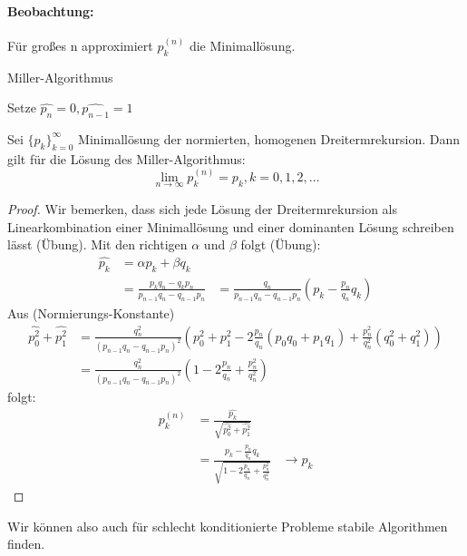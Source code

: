 \paragraph{Beobachtung:} Für großes n approximiert $p_k^{(n)}$ die Minimallösung.\\
\begin{algorithm}[H]
\caption{Miller-Algorithmus}
 Setze $\hat{p_n}=0, \hat{p_{n-1}} =1$\\
\end{algorithm}
\begin{theorem}
Sei $\{p_k\}_{k=0}^{\infty}$ Minimallösung der normierten, homogenen Dreitermrekursion. %
Dann gilt für die Lösung des Miller-Algorithmus:
\[
\lim_{n \to \infty} p_k^{(n)}=p_k , k=0,1,2,\ldots
\]
\end{theorem}
\begin{proof}
Wir bemerken, dass sich jede Lösung der Dreitermrekursion als Linearkombination einer Minimallösung und einer dominanten Lösung schreiben lässt (Übung). Mit den richtigen $\alpha$ und $\beta$ folgt (Übung):
\begin{align*}
\hat{p_k} 
&= \alpha p_k + \beta q_k \\
&= \frac{p_kq_n-q_kp_n}{p_{n-1}q_n-q_{n-1}p_n}
&= \frac{q_n}{p_{n-1}q_n-q_{n-1}p_n}\left( p_k-\frac{p_n}{q_n}q_k \right)
\end{align*}
Aus (Normierungs-Konstante)
\begin{align*}
\hat{p_0^2}+\hat{p_1^2}
&= \frac{q_n^2}{\left( p_{n-1} q_n- q_{n-1} p_n \right)^2}\left( p_0^2+p_1^2 -2 \frac{p_n}{q_n}(p_0q_0+p_1q_1) + \frac{p_n^2}{q_n^2}(q_0^2 +q_1^2) \right) \\
&= \frac{q_n^2}{(p_{n-1}q_n-q_{n-1}p_n)^2}\left( 1- 2 \frac{p_n}{q_n}+\frac{p_n^2}{q_n^2} \right)
\end{align*}
folgt:
\begin{align*}
p_k^{(n)}
&= \frac{\hat{p_k}}{\sqrt{\hat{p_0^2}+ \hat{p_1^2}}} \\
&= \frac{p_k-\frac{p_n}{q_n}q_k}{\sqrt{1-2 \frac{p_n}{q_n}+ \frac{p_n^2}{q_n^2}}}
&\to p_k
\end{align*}
\end{proof}
Wir können also auch für schlecht konditionierte Probleme stabile Algorithmen finden.

